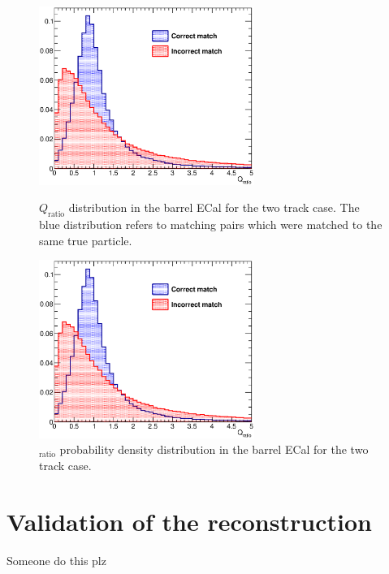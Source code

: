 \begin{figure}
  \centering
  \parbox{7cm}{
    \includegraphics[width=7cm]{images/hough_3d_matching/3DMatching_Barrel_2Track_QRatio_Separation.eps}
    \caption{$Q_{\textrm{ratio}}$ distribution in the barrel ECal for the two track case.  The blue distribution refers to matching pairs which were matched to the same true particle.}
    \label{fig:3DMatchingBarrel2TrackQRatioSeparation}}
    \qquad
    \begin{minipage}{7cm}
      \includegraphics[width=7cm]{images/hough_3d_matching/3DMatching_Barrel_2Track_QRatio_Separation.eps}
      \caption{$_{\textrm{ratio}}$ probability density distribution in the barrel ECal for the two track case.}
      \label{fig:3DMatchingBarrel2TrackQRatioPDF}
    \end{minipage}
\end{figure}

%
\section{Validation of the reconstruction}
\label{sec:ReconstructionValidation}
Someone do this plz 
